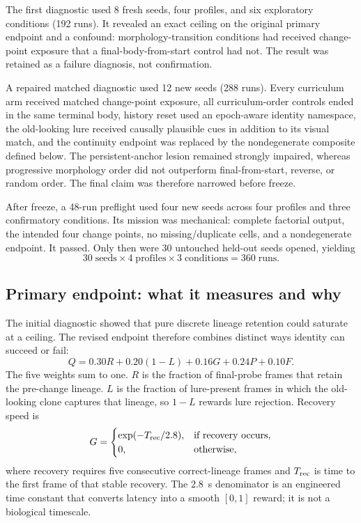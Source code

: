 \documentclass[journal]{IEEEtran}
\begin{document}
The first diagnostic used 8 fresh seeds, four profiles, and six exploratory conditions (192 runs). It revealed an exact ceiling on the original primary endpoint and a confound: morphology-transition conditions had received change-point exposure that a final-body-from-start control had not. The result was retained as a failure diagnosis, not confirmation.

A repaired matched diagnostic used 12 new seeds (288 runs). Every curriculum arm received matched change-point exposure, all curriculum-order controls ended in the same terminal body, history reset used an epoch-aware identity namespace, the old-looking lure received causally plausible cues in addition to its visual match, and the continuity endpoint was replaced by the nondegenerate composite defined below. The persistent-anchor lesion remained strongly impaired, whereas progressive morphology order did not outperform final-from-start, reverse, or random order. The final claim was therefore narrowed before freeze.

After freeze, a 48-run preflight used four new seeds across four profiles and three confirmatory conditions. Its mission was mechanical: complete factorial output, the intended four change points, no missing/duplicate cells, and a nondegenerate endpoint. It passed. Only then were 30 untouched held-out seeds opened, yielding
\begin{equation}
30\;\text{seeds}\times4\;\text{profiles}\times3\;\text{conditions}=360\;\text{runs}.
\label{eq:heldoutcount}
\end{equation}

\subsection{Primary endpoint: what it measures and why}
The initial diagnostic showed that pure discrete lineage retention could saturate at a ceiling. The revised endpoint therefore combines distinct ways identity can succeed or fail:
\begin{equation}
Q=0.30R+0.20(1-L)+0.16G+0.24P+0.10F.
\label{eq:q}
\end{equation}
The five weights sum to one. $R$ is the fraction of final-probe frames that retain the pre-change lineage. $L$ is the fraction of lure-present frames in which the old-looking clone captures that lineage, so $1-L$ rewards lure rejection. Recovery speed is
\begin{equation}
G=\begin{cases}
\exp(-T_{\rm rec}/2.8),&\text{if recovery occurs},\\
0,&\text{otherwise},
\end{cases}
\label{eq:recovery}
\end{equation}
where recovery requires five consecutive correct-lineage frames and $T_{\rm rec}$ is time to the first frame of that stable recovery. The 2.8~s denominator is an engineered time constant that converts latency into a smooth $[0,1]$ reward; it is not a biological timescale.
\end{document}
